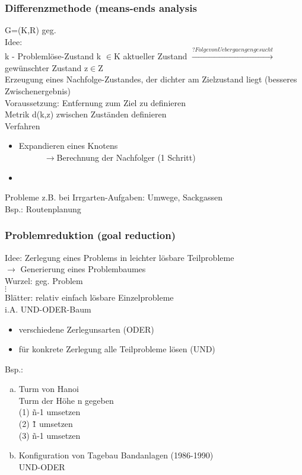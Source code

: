 \documentclass[a4paper,14pt]{article}
\begin{document}
\subsubsection{Differenzmethode (means-ends analysis}
G=(K,R) geg.\\
Idee:\\
k - Problemlöse-Zustand k $\in$K
aktueller Zustand $\xrightarrow{? Folge von Uebergaengen gesucht}$gewünschter Zustand z$\in$Z\\
Erzeugung eines Nachfolge-Zustandes, der \glqq{}dichter\grqq{} am Zielzustand liegt (besseres Zwischenergebnis)\\
Voraussetzung: \glqq{}Entfernung\grqq{} zum Ziel zu definieren\\
Metrik d(k,z) zwischen Zuständen definieren\\
Verfahren
\begin{itemize}
 \item Expandieren eines Knotens\\
 ~~~~~~$\rightarrow$Berechnung der Nachfolger (1 Schritt)
 \item
\end{itemize}

Probleme z.B. bei Irrgarten-Aufgaben: Umwege, Sackgassen\\
Bsp.: Routenplanung

\subsubsection{Problemreduktion (goal reduction)}
Idee: Zerlegung eines Problems in leichter lösbare Teilprobleme\\
$\rightarrow$ Generierung eines Problembaumes\\
Wurzel: geg. Problem\\
$\vdots$\\
Blätter: relativ einfach lösbare Einzelprobleme\\
i.A. UND-ODER-Baum\\
\begin{itemize}
 \item verschiedene Zerlegunsarten (ODER)
 \item für konkrete Zerlegung alle Teilprobleme lösen (UND)
\end{itemize}

Bsp.:
\begin{enumerate}[(a)]
 \item Turm von Hanoi\\
 Turm der Höhe n gegeben\\
 (1) \~ n-1 umsetzen\\
 (2) \~ 1 umsetzen\\
 (3) \~ n-1 umsetzen\\
 \item Konfiguration von Tagebau Bandanlagen (1986-1990)\\
 UND-ODER\\
\end{enumerate}
\end{document}
